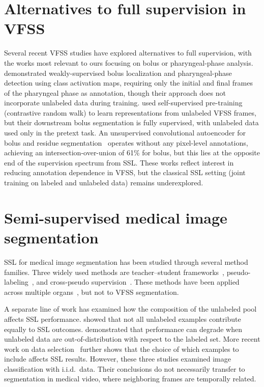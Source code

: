 \documentclass[
  msc,
  american
]{ThesisPUC_v2}
\begin{document}
\section{Alternatives to full supervision in VFSS}
\label{sec:related-alternatives}

Several recent VFSS studies have explored alternatives to full supervision, with the works most relevant to ours focusing on bolus or pharyngeal-phase analysis. \citet{ref_bandini2022} demonstrated weakly-supervised bolus localization and pharyngeal-phase detection using class activation maps, requiring only the initial and final frames of the pharyngeal phase as annotation, though their approach does not incorporate unlabeled data during training. \citet{ref_martinovic2025} used self-supervised pre-training (contrastive random walk) to learn representations from unlabeled VFSS frames, but their downstream bolus segmentation is fully supervised, with unlabeled data used only in the pretext task. An unsupervised convolutional autoencoder for bolus and residue segmentation~\citep{ref_unsup_bolus2025} operates without any pixel-level annotations, achieving an intersection-over-union of 61\% for bolus, but this lies at the opposite end of the supervision spectrum from SSL. These works reflect interest in reducing annotation dependence in VFSS, but the classical SSL setting (joint training on labeled and unlabeled data) remains underexplored.

\section{Semi-supervised medical image segmentation}
\label{sec:related-ssl}

SSL for medical image segmentation has been studied through several method families. Three widely used methods are teacher--student frameworks~\citep{ref_mean_teacher}, pseudo-labeling~\citep{ref_fixmatch}, and cross-pseudo supervision~\citep{ref_cps}. These methods have been applied across multiple organs~\citep{ref_ssl_survey,ref_han2024}, but not to VFSS segmentation.

A separate line of work has examined how the composition of the unlabeled pool affects SSL performance. \citet{ref_ren2020} showed that not all unlabeled examples contribute equally to SSL outcomes. \citet{ref_oliver2018} demonstrated that performance can degrade when unlabeled data are out-of-distribution with respect to the labeled set. More recent work on data selection~\citep{ref_rdss2024} further shows that the choice of which examples to include affects SSL results. However, these three studies examined image classification with i.i.d.\ data. Their conclusions do not necessarily transfer to segmentation in medical video, where neighboring frames are temporally related.
\end{document}
